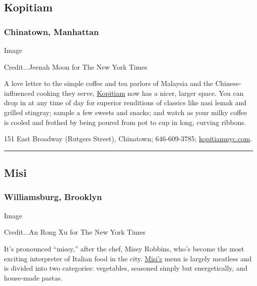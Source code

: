 \hypertarget{kopitiam}{%
\subsection{Kopitiam}\label{kopitiam}}

\hypertarget{chinatown-manhattan}{%
\subsubsection{Chinatown, Manhattan}\label{chinatown-manhattan}}

Image

Credit...Jeenah Moon for The New York Times

A love letter to the simple coffee and tea parlors of Malaysia and the
Chinese-influenced cooking they serve,
\href{https://www.nytimes3xbfgragh.onion/2018/09/25/dining/kopitiam-restaurant-review.html}{Kopitiam}
now has a nicer, larger space. You can drop in at any time of day for
superior renditions of classics like nasi lemak and grilled stingray;
sample a few sweets and snacks; and watch as your milky coffee is cooled
and frothed by being poured from pot to cup in long, curving ribbons.

151 East Broadway (Rutgers Street), Chinatown; 646-609-3785;
\href{https://www.kopitiamnyc.com/}{kopitiamnyc.com}.

\begin{center}\rule{0.5\linewidth}{\linethickness}\end{center}

\hypertarget{misi}{%
\subsection{Misi}\label{misi}}

\hypertarget{williamsburg-brooklyn}{%
\subsubsection{Williamsburg, Brooklyn}\label{williamsburg-brooklyn}}

Image

Credit...An Rong Xu for The New York Times

It's pronounced ``missy,'' after the chef, Missy Robbins, who's become
the most exciting interpreter of Italian food in the city.
\href{https://www.nytimes3xbfgragh.onion/2018/08/28/dining/missy-robbins-misi.html}{Misi's}
menu is largely meatless and is divided into two categories: vegetables,
seasoned simply but energetically, and house-made pastas.

